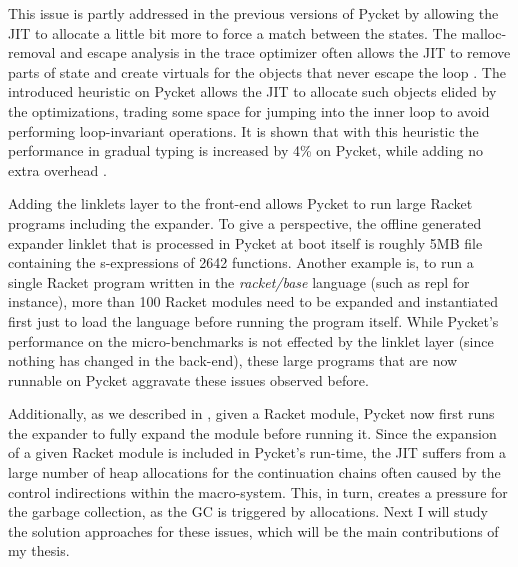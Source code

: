 This issue is partly addressed in the previous versions of Pycket by
allowing the JIT to allocate a little bit more to force a match
between the states. The malloc-removal and escape analysis in the
trace optimizer often allows the JIT to remove parts of state and
create virtuals for the objects that never escape the loop
\cite{malloc-removal:11, loop-aware:12}. The introduced heuristic on
Pycket allows the JIT to allocate such objects elided by the
optimizations, trading some space for jumping into the inner loop to
avoid performing loop-invariant operations. It is shown that with this
heuristic the performance in gradual typing is increased by 4\% on
Pycket, while adding no extra overhead \cite{pycket17}.

Adding the linklets layer to the front-end allows Pycket to run large
Racket programs including the expander. To give a perspective, the
offline generated expander linklet that is processed in Pycket at boot
itself is roughly 5MB file containing the s-expressions of 2642
functions. Another example is, to run a single Racket program written
in the \emph{racket/base} language (such as repl for instance), more
than 100 Racket modules need to be expanded and instantiated first
just to load the language before running the program itself. While
Pycket's performance on the micro-benchmarks is not effected by the
linklet layer (since nothing has changed in the back-end), these large
programs that are now runnable on Pycket aggravate these issues
observed before.

Additionally, as we described in , given a
Racket module, Pycket now first runs the expander to fully expand the
module before running it. Since the expansion of a given Racket module
is included in Pycket's run-time, the JIT suffers from a large number
of heap allocations for the continuation chains often caused by the
control indirections within the macro-system. This, in turn, creates a
pressure for the garbage collection, as the GC is triggered by
allocations. Next I will study the solution approaches for these
issues, which will be the main contributions of my thesis.


